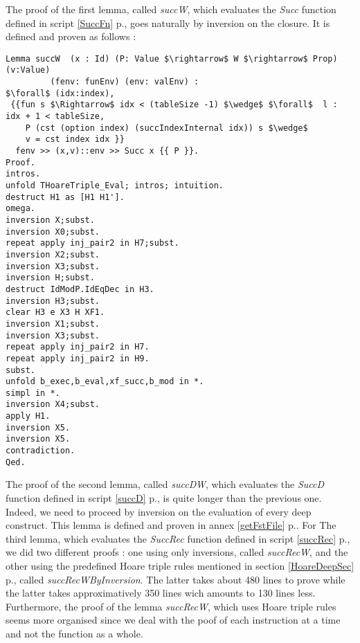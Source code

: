 The proof of the first lemma, called \textit{succW}, which evaluates the \textit{Succ} function defined in script \ref{SuccFn} p.\pageref{SuccFn}, goes naturally by inversion on the closure. It is defined and proven as follows :
\begin{lstlisting}[caption = {succW Lemma definition and proof}, xleftmargin=-.05\textwidth,
xrightmargin=-.05\textwidth,mathescape=true]
Lemma succW  (x : Id) (P: Value $\rightarrow$ W $\rightarrow$ Prop) (v:Value) 
	     (fenv: funEnv) (env: valEnv) :
$\forall$ (idx:index),
 {{fun s $\Rightarrow$ idx < (tableSize -1) $\wedge$ $\forall$  l : idx + 1 < tableSize, 
    P (cst (option index) (succIndexInternal idx)) s $\wedge$
    v = cst index idx }}  
  fenv >> (x,v)::env >> Succ x {{ P }}.
Proof.
intros.
unfold THoareTriple_Eval; intros; intuition.
destruct H1 as [H1 H1'].
omega.
inversion X;subst.
inversion X0;subst.
repeat apply inj_pair2 in H7;subst.
inversion X2;subst.
inversion X3;subst.
inversion H;subst.
destruct IdModP.IdEqDec in H3.
inversion H3;subst.
clear H3 e X3 H XF1.
inversion X1;subst.
inversion X3;subst.
repeat apply inj_pair2 in H7.
repeat apply inj_pair2 in H9.
subst.
unfold b_exec,b_eval,xf_succ,b_mod in *.
simpl in *.
inversion X4;subst.
apply H1.
inversion X5.
inversion X5.
contradiction.
Qed.
\end{lstlisting} \vspace{4pt}

The proof of the second lemma, called \textit{succDW}, which evaluates the \textit{SuccD} function defined in script \ref{succD} p.\pageref{succD}, is quite longer than the previous one. Indeed, we need to proceed by inversion on the evaluation of every deep construct. This lemma is defined and proven in annex \ref{getFstFile} p.\pageref{getFstFile}.    
For The third lemma, which evaluates the \textit{SuccRec} function defined in script \ref{succRec} p.\pageref{succRec}, we did two different proofs : one using only inversions, called \textit{succRecW}, and the other using the predefined Hoare triple rules mentioned in section \ref{HoareDeepSec} p.\pageref{HoareDeepSec}, called \textit{succRecWByInversion}. The latter takes about 480 lines to prove while the latter takes approximatively 350 lines wich amounts to 130 lines less. Furthermore, the proof of the lemma \textit{succRecW}, which uses Hoare triple rules seems more organised since we deal with the poof of each instruction at a time and not the function as a whole.\\


